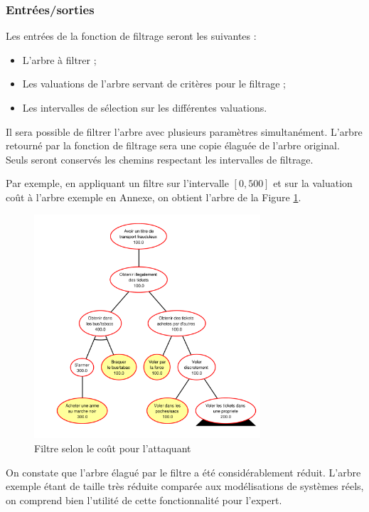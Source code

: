 			\subsubsection{Entrées/sorties}

		Les entrées de la fonction de filtrage seront les suivantes :
		\begin{itemize}
			\item L'arbre à filtrer ;
			\item Les valuations de l'arbre servant de critères pour le filtrage ;
			\item Les intervalles de sélection sur les différentes valuations.
		\end{itemize} %
		
		Il sera possible de filtrer l'arbre avec plusieurs paramètres simultanément.
		L'arbre retourné par la fonction de filtrage sera une copie élaguée de l'arbre original. Seuls seront conservés les chemins respectant les intervalles de filtrage.

		Par exemple, en appliquant un filtre sur l'intervalle $[0, 500]$ et sur la valuation \og coût \fg à l'arbre exemple en Annexe, on obtient l'arbre de la Figure \ref{fig:arbre_post_filtre}.

		\begin{figure}[!h]
			\begin{center}
				\includegraphics[width=0.75\textwidth]{figure/post_filtre.pdf}
			\end{center}
			\caption{Filtre selon le coût pour l'attaquant}
			\label{fig:arbre_post_filtre}
		\end{figure}
		On constate que l'arbre élagué par le filtre a été considérablement réduit. L'arbre exemple étant de taille très réduite comparée aux modélisations de systèmes réels, on comprend bien l'utilité de cette fonctionnalité pour l'expert.

